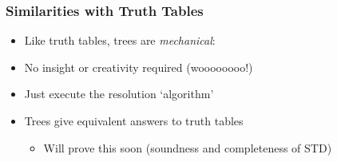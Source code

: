 \begin{frame}
\frametitle{Similarities with Truth Tables}

\begin{itemize}[<+->]

\item Like truth tables, trees are \textit{mechanical}:

\bigskip

\bi
\item No insight or creativity required (woooooooo!)

\item Just execute the resolution `algorithm'
\ei

\bigskip 

\item Trees give equivalent answers to truth tables

\begin{itemize}

\item Will prove this soon (soundness and completeness of STD)  

\end{itemize}


\end{itemize}
\end{frame}

